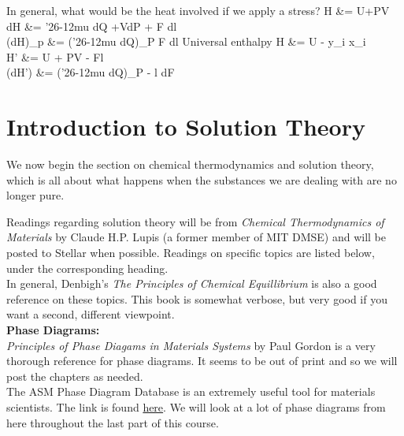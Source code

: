 \documentclass[12pt]{article}
\def\dbar{{\mathchar'26\mkern-12mu d}}
\begin{document}
In general, what would be the heat involved if we apply a stress?
\eqs
H &= U+PV\\
dH &= \dbar Q +VdP + F dl\\
(dH)_p &= (\dbar Q)_P F dl
\eqe
Universal enthalpy
\eqs
H &= U - \sum y_i x_i\\
H' &= U + PV - Fl\\
(dH') &= (\dbar Q)_P - l dF
\eqe
%
\section{Introduction to Solution Theory}
We now begin the section on chemical thermodynamics and solution theory, which is all about what happens when the substances we are dealing with are no longer pure. 

Readings regarding solution theory will be from \textit{ Chemical Thermodynamics of Materials} by Claude H.P. Lupis (a former member of MIT DMSE) and will be posted to Stellar when possible. Readings on specific topics are listed below, under the corresponding heading.\\
In general, Denbigh{'}s \textit{ The Principles of Chemical Equillibrium} is also a good reference on these topics. This book is somewhat verbose, but very good if you want a second, different viewpoint.\\
\textbf{Phase Diagrams:}\\
\textit{Principles of Phase Diagams in Materials Systems} by Paul Gordon is a very thorough reference for phase diagrams. It seems to be out of print and so we will post the chapters as needed.\\
The ASM Phase Diagram Database is an extremely useful tool for materials scientists. The link is found \href{http://www1.asminternational.org/asmenterprise/apd/BrowseAPD.aspx}{here}. We will look at a lot of phase diagrams from here throughout the last part of this course.
\end{document}
